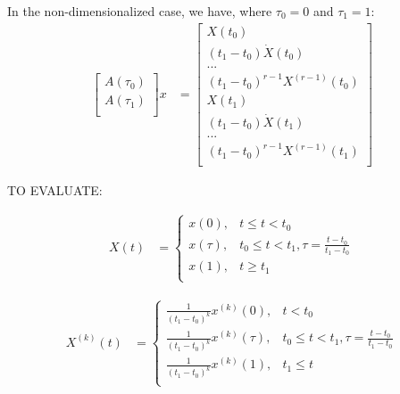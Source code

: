 \documentclass[11pt]{article}
\begin{document}
\mbox{} \newline
In the non-dimensionalized case, we have, where $\tau_0 = 0$ and $\tau_1 = 1$:
\begin{align*}
 \begin{bmatrix}
  A(\tau_0) \\
  A(\tau_1) \\
 \end{bmatrix} 
 x
 &= 
\begin{bmatrix}
  X(t_0) \\
  {(t_1-t_0)} \dot{X} (t_0) \\
  ... \\
  {(t_1-t_0)^{r-1}} X^{(r-1)}(t_0) \\
    X(t_1) \\
  {(t_1-t_0)} \dot{X} (t_1) \\
  ... \\
  {(t_1-t_0)^{r-1}} X^{(r-1)}(t_1) \\
 \end{bmatrix}
\end{align*}




\mbox{} \newline
\mbox{} \newline
TO EVALUATE: \newline

\begin{align*}
X(t) &= 
\begin{cases}
    x(0), & t \le t < t_0 \\
    x(\tau), & t_0 \le t < t_1, \tau = \frac{t-t_0}{t_1-t_0} \\
    x(1), & t \ge t_1 \\
\end{cases}
\end{align*} 

\begin{align*}
X^{(k)}(t) &= 
\begin{cases}
    \frac{1}{(t_1-t_0)^k} x^{(k)}(0), & t < t_0 \\
    \frac{1}{(t_1-t_0)^k} x^{(k)}(\tau), & t_0 \le t < t_1, \tau = \frac{t-t_0}{t_1-t_0} \\
    \frac{1}{(t_1-t_0)^k} x^{(k)}(1), &  t_1 \le t \\
\end{cases}
\end{align*} 
\end{document}
